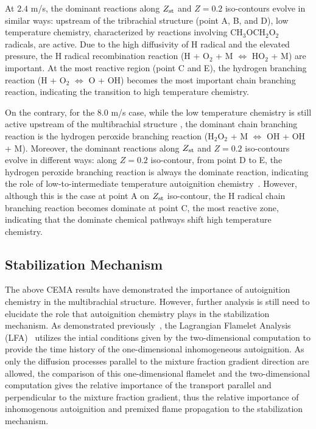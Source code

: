 \documentclass{wssci}
\begin{document}
At $2.4$ m/s, the dominant reactions along $Z_{\rm st}$ and $Z = 0.2$ iso-contours evolve in similar ways: upstream of the tribrachial structure (point A, B, and D), low temperature chemistry, characterized by reactions involving CH$_3$OCH$_2$O$_2$ radicals, are active.  Due to the high diffusivity of H radical and the elevated pressure, the H radical recombination reaction (H + O$_2$ + M $\Longleftrightarrow$ HO$_2$ + M) are important.  At the most reactive region (point C and E), the hydrogen branching reaction (H + O$_2$ $\Longleftrightarrow$ O + OH) becomes the most important chain branching reaction, indicating the transition to high temperature chemistry.

On the contrary, for the $8.0$ m/s case, while the low temperature chemistry is still active upstream of the multibrachial structure , the dominant chain branching reaction is the hydrogen peroxide branching reaction (H$_2$O$_2$ + M $\Longleftrightarrow$ OH + OH + M).  Moreover, the dominant reactions along $Z_{\rm st}$ and $Z = 0.2$ iso-contours evolve in different ways: along $Z = 0.2$ iso-contour, from point D to E, the hydrogen peroxide branching reaction is always the dominate reaction, indicating the role of low-to-intermediate temperature autoignition chemistry~\cite{westbrook00}.  However, although this is the case at point A on $Z_{\rm st}$ iso-contour, the H radical chain branching reaction becomes dominate at point C, the most reactive zone, indicating that the dominate chemical pathways shift high temperature chemistry.  

\subsection{Stabilization Mechanism} 
The above CEMA results have demonstrated the importance of autoignition chemistry in the multibrachial structure.  However, further analysis is still need to elucidate the role that autoignition chemistry plays in the stabilization mechanism.  As demonstrated previously~\cite{deng15}, the Lagrangian Flamelet Analysis (LFA)~\cite{pitsch98a} utilizes the intial conditions given by the two-dimensional computation to provide the time history of the one-dimensional inhomogeneous autoignition.  As only the diffusion processes parallel to the mixture fraction gradient direction are allowed, the comparison of this one-dimensional flamelet and the two-dimensional computation gives the relative importance of the transport parallel and perpendicular to the mixture fraction gradient, thus the relative importance of inhomogenous autoignition and premixed flame propagation to the stabilization mechanism.
\end{document}
